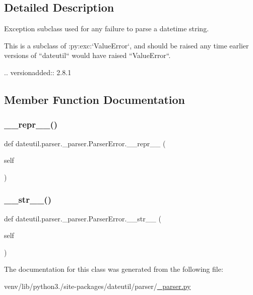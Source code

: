 \subsection{Detailed Description}
\begin{DoxyVerb}Exception subclass used for any failure to parse a datetime string.

This is a subclass of :py:exc:`ValueError`, and should be raised any time
earlier versions of ``dateutil`` would have raised ``ValueError``.

.. versionadded:: 2.8.1
\end{DoxyVerb}
 

\subsection{Member Function Documentation}
\mbox{\label{classdateutil_1_1parser_1_1__parser_1_1ParserError_a66a21b4ebb69c331f44145c0952f568e}} 
\subsubsection{\texorpdfstring{\+\_\+\+\_\+repr\+\_\+\+\_\+()}{\_\_repr\_\_()}}
{\footnotesize\ttfamily def dateutil.\+parser.\+\_\+parser.\+Parser\+Error.\+\_\+\+\_\+repr\+\_\+\+\_\+ (\begin{DoxyParamCaption}\item[{}]{self }\end{DoxyParamCaption})}

\mbox{\label{classdateutil_1_1parser_1_1__parser_1_1ParserError_aa4bdb35b29f19a7219533461c7a49c76}} 
\subsubsection{\texorpdfstring{\+\_\+\+\_\+str\+\_\+\+\_\+()}{\_\_str\_\_()}}
{\footnotesize\ttfamily def dateutil.\+parser.\+\_\+parser.\+Parser\+Error.\+\_\+\+\_\+str\+\_\+\+\_\+ (\begin{DoxyParamCaption}\item[{}]{self }\end{DoxyParamCaption})}



The documentation for this class was generated from the following file\+:\begin{DoxyCompactItemize}
\item 
venv/lib/python3./site-\/packages/dateutil/parser/\hyperlink{dateutil_2parser_2__parser_8py}{\+\_\+parser.\+py}\end{DoxyCompactItemize}
